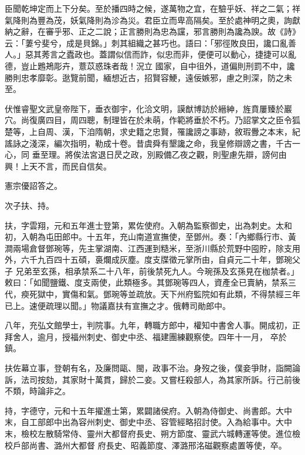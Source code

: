 \begin{pinyinscope}
 臣聞乾坤定而上下分矣。至於播四時之候，遂萬物之宜，在驗乎妖、祥之二氣；祥氣降則為豐為茂，妖氣降則為沴為災。君臣立而卑高隔矣。至於處神明之奧，詢獻納之辭，在審乎邪、正之二說；正言勝則為忠為讜，邪言勝則為讒為諛。故《詩》云：「萋兮斐兮，成是貝錦。」刺其組織之甚巧也。語曰：「邪徑敗良田，讒口亂善人。」惡其莠言之蠹政也。蓋謂似信而詐，似忠而非，便便可以動心，捷捷可以亂德，豈止鶗鴂彫卉，薏苡惑珠者哉！況立
 國家，自中徂外，道偏則刑罰不中，讒勝則忠孝靡彰。逖覽前聞，緬想近古，招賢容鯁，遠佞嫉邪，慮之則深，防之未至。



 伏惟睿聖文武皇帝陛下，垂衣御宇，化洽文明，謨猷博訪於縉紳，旌賁屢臻於巖穴。尚復廣四目，周四聰，制理皆在於未萌，作範將垂於不朽。乃詔掌文之臣令狐楚等，上自周、漢，下洎隋朝，求史籍之忠賢，罹讒謗之事跡，敘瑕釁之本末，紀謠詠之淺深，編次指明，勒成十卷。昔虞舜有墾讒之命，我皇修辯謗之書，千古一心，同
 垂至理。將俟法宮退日昃之政，別殿備乙夜之觀，則聖慮先辯，謗何由興！上天不言，而民自信矣。



 憲宗優詔答之。



 次子扶、持。



 扶，字雲翔，元和五年進士登第，累佐使府。入朝為監察御史，出為刺史。太和初，入朝為屯田郎中。十五年，充山南道宣撫使，至鄧州。奏：「內鄉縣行市、黃澗兩場倉督鄧琬等，先主掌湖南、江西運到糙米，至浙川縣於荒野中囤貯，除支用外，六千九百四十五碩，裛爛成灰塵。度支牒徵元掌所由，自貞元二十年，鄧琬父子
 兄弟至玄孫，相承禁系二十八年，前後禁死九人。今琬孫及玄孫見在枷禁者。」敕曰：「如聞鹽鐵、度支兩使，此類極多。其鄧琬等四人，資產全已賣納，禁系三代，瘐死獄中，實傷和氣。鄧琬等並疏放。天下州府監院如有此類，不得禁經三年已上。速便疏理以聞。」物議嘉扶有宣撫之才。俄轉司勛郎中。



 八年，充弘文館學士，判院事。九年，轉職方郎中，權知中書舍人事。開成初，正拜舍人，逾月，授福州刺史、御史中丞、福建團練觀察使。四年十一月，
 卒於鎮。



 扶佐幕立事，登朝有名，及廉問甌、閩，政事不治。身歿之後，僕妾爭財，詣闕論訴，法司按劾，其家財十萬貫，歸於二妾。又嘗枉殺部人，為其家所訴。行己前後不類，時論非之。



 持，字德守，元和十五年擢進士第，累闢諸侯府。入朝為侍御史、尚書郎。大中末，自工部郎中出為容州刺史、御史中丞、容管經略招討使。入為給事中。大中末，檢校左散騎常侍、靈州大都督府長史、朔方節度、靈武六城轉運等使。進位檢校戶部尚書、潞州大都督
 府長史、昭義節度、澤潞邢洺磁觀察處置等使，卒。




\end{pinyinscope}
